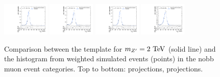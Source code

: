 \begin{figure}[htpb]
  \includegraphics[width=0.2\textwidth]{fig/2Dfit/templateVsReco_VBFZprToWW2000_r0_MJ_mu_HP_nobb_LDy.pdf}
  \includegraphics[width=0.2\textwidth]{fig/2Dfit/templateVsReco_VBFZprToWW2000_r0_MJ_mu_LP_nobb_LDy.pdf}
  \includegraphics[width=0.2\textwidth]{fig/2Dfit/templateVsReco_VBFZprToWW2000_r0_MJ_mu_HP_nobb_HDy.pdf}
  \includegraphics[width=0.2\textwidth]{fig/2Dfit/templateVsReco_VBFZprToWW2000_r0_MJ_mu_LP_nobb_HDy.pdf}\\
  \caption{
    Comparison between the \VBF\ZprtoWW template for $m_{\Zpr}=2\unit{TeV}$ (solid line) and the histogram from weighted simulated events (points) in the nobb muon event categories.
    Top to bottom: \MVV projections, \MJ projections.
  }
  \label{fig:1dtemplateVsReco_VBFZprToWW2000_Run2}
\end{figure}

